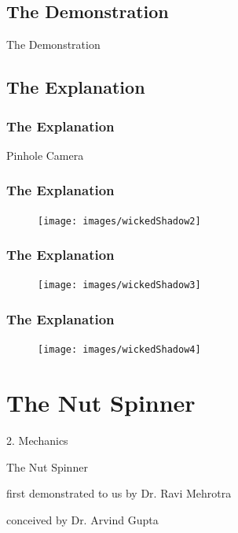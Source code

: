 \documentclass{beamer}
\begin{document}
	\subsection{The Demonstration}
		\begin{frame}
			\Large{\centerline{The Demonstration}}
		\end{frame}

	\subsection{The Explanation}
		\begin{frame}
		\frametitle{The Explanation}
			\Large{\centerline{Pinhole Camera}}
		\end{frame}

		\begin{frame}
		\frametitle{The Explanation}
			\begin{figure}				
			\texttt{[image: images/wickedShadow2]}
			\end{figure}
		\end{frame}

		\begin{frame}
		\frametitle{The Explanation}
			\begin{figure}				
			\texttt{[image: images/wickedShadow3]}
			\end{figure}
		\end{frame}

		\begin{frame}
		\frametitle{The Explanation}
			\begin{figure}				
			\texttt{[image: images/wickedShadow4]}
			\end{figure}
		\end{frame}


\section{The Nut Spinner}
	\begin{frame}
		2. Mechanics
		\Huge{\centerline{The Nut Spinner}}		
		\tiny{\centerline{first demonstrated to us by Dr. Ravi Mehrotra}}
		\tiny{\centerline{conceived by Dr. Arvind Gupta}}
	\end{frame}
\end{document}
